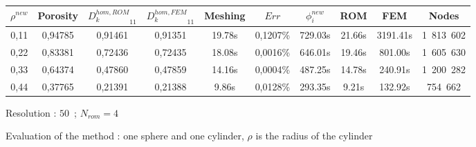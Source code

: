 \begin{figure}[H]%
%
\begin{center}
\begin{tabular}{|c|c||c|c||c|c||c|c||c||c|}
\hline
\rowcolor{lightgray} $\rho^{new}$&Porosity&${D_k^{hom,ROM}}_{11}$&${D_k^{hom,FEM}}_{11}$&Meshing&$Err$&$\phi_i^{new}$&ROM&FEM&Nodes\\
\hline
0,11&0,94785&0,91461&0,91351&19.78s&0,1207\%&729.03s&21.66s&3191.41s&1\ 813\ 602\\
\hline
0,22&0,83381&0,72436&0,72435&18.08s&0,0016\%&646.01s&19.46s&801.00s&1\ 605\ 630\\
\hline
0,33&0,64374&0,47860&0,47859&14.16s&0,0004\%&487.25s&14.78s&240.91s&1\ 200\ 282\\
\hline
0,44&0,37765&0,21391&0,21388&9.86s&0,0128\%&293.35s&9.21s&132.92s&754\ 662\\
\hline
\end{tabular}
\end{center}
\caption{Resolution : $50$\ ; $N_{rom}=4$}
%
\end{figure}

\ligneinter

\begin{figure}[H]%
%
\begin{table}[H]
\begin{center}
%
%
\qquad
{}%
%
\end{center}
\end{table}
%
\caption{Evaluation of the method : one sphere and one cylinder, $\rho$ is the radius of the cylinder}
\end{figure}